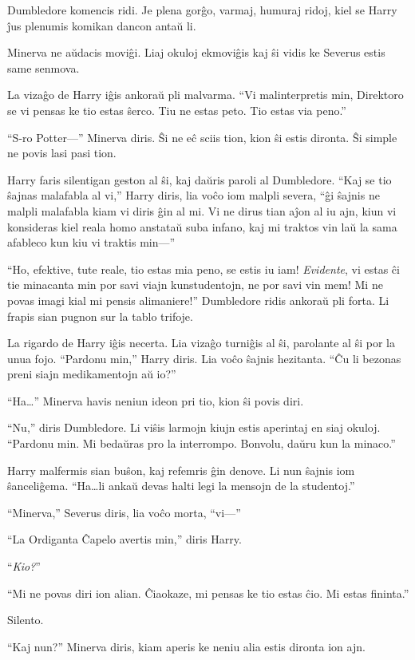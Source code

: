 Dumbledore komencis ridi. Je plena gorĝo, varmaj, humuraj ridoj, kiel
se Harry ĵus plenumis komikan dancon antaŭ li.

Minerva ne aŭdacis moviĝi. Liaj okuloj ekmoviĝis kaj ŝi vidis ke
Severus estis same senmova.

La vizaĝo de Harry iĝis ankoraŭ pli malvarma. ``Vi malinterpretis min,
Direktoro se vi pensas ke tio estas ŝerco. Tiu ne estas peto. Tio
estas via peno.''

``S-ro Potter—'' Minerva diris. Ŝi ne eĉ sciis tion, kion ŝi estis
dironta. Ŝi simple ne povis lasi pasi tion.  

Harry faris silentigan geston al ŝi, kaj daŭris paroli al
Dumbledore. ``Kaj se tio ŝajnas malafabla al vi,'' Harry diris, lia
voĉo iom malpli severa, ``ĝi ŝajnis ne malpli malafabla kiam vi diris
ĝin al mi. Vi ne dirus tian aĵon al iu ajn, kiun vi konsideras kiel
reala homo anstataŭ suba infano, kaj mi traktos vin laŭ la sama
afableco kun kiu vi traktis min—''

``Ho, efektive, tute reale, tio estas mia peno, se estis iu iam!
\emph{Evidente}, vi estas ĉi tie minacanta min por savi viajn
kunstudentojn, ne por savi vin mem! Mi ne povas imagi kial mi pensis
alimaniere!'' Dumbledore ridis ankoraŭ pli forta. Li frapis sian
pugnon sur la tablo trifoje.

La rigardo de Harry iĝis necerta. Lia vizaĝo turniĝis al ŝi, parolante
al ŝi por la unua fojo. ``Pardonu min,'' Harry diris. Lia voĉo ŝajnis
hezitanta. ``Ĉu li bezonas preni siajn medikamentojn aŭ io?''

``Ha\ldots'' Minerva havis neniun ideon pri tio, kion ŝi povis diri.

``Nu,'' diris Dumbledore. Li viŝis larmojn kiujn estis aperintaj en
siaj okuloj. ``Pardonu min. Mi bedaŭras pro la interrompo. Bonvolu,
daŭru kun la minaco.''

Harry malfermis sian buŝon, kaj refemris ĝin denove. Li nun ŝajnis iom
ŝanceliĝema. ``Ha\ldots li ankaŭ devas halti legi la mensojn de la
studentoj.''

``Minerva,'' Severus diris, lia voĉo morta, ``vi—''

``La Ordiganta Ĉapelo avertis min,'' diris Harry.

``\emph{Kio?}''

``Mi ne povas diri ion alian. Ĉiaokaze, mi pensas ke tio estas ĉio. Mi estas fininta.''

Silento.

``Kaj nun?'' Minerva diris, kiam aperis ke neniu alia estis dironta ion ajn.


